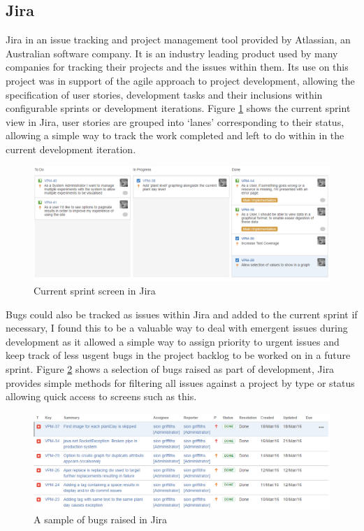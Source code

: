 \subsection{Jira}

Jira \cite{jira} in an issue tracking and project management tool provided by Atlassian, an Australian software company. It is an industry leading product used by many companies for tracking their projects and the issues within them. Its use on this project was in support of the agile approach to project development, allowing the specification of user stories, development tasks and their inclusions within configurable sprints or development iterations. Figure \ref{fig:jira_sprint} shows the current sprint view in Jira, user stories are grouped into `lanes' corresponding to their status, allowing a simple way to track the work completed and left to do within in the current development iteration.

\begin{figure}[H]
    \centering
    \includegraphics[width=\textwidth]{images/tools/sprint1}
    \caption{Current sprint screen in Jira}
    \label{fig:jira_sprint}
\end{figure} 

 Bugs could also be tracked as issues within Jira and added to the current sprint if necessary, I found this to be a valuable way to deal with emergent issues during development as it allowed a simple way to assign priority to urgent issues and keep track of less usgent bugs in the project backlog to be worked on in a future sprint. Figure \ref{fig:jira_bugs} shows a selection of bugs raised as part of development, Jira provides simple methods for filtering all issues against a project by type or status allowing quick access to screens such as this.

\begin{figure}[H]
    \centering
    \includegraphics[width=\textwidth]{images/tools/jira_bugs}
    \caption{A sample of bugs raised in Jira}
    \label{fig:jira_bugs}
\end{figure} 


